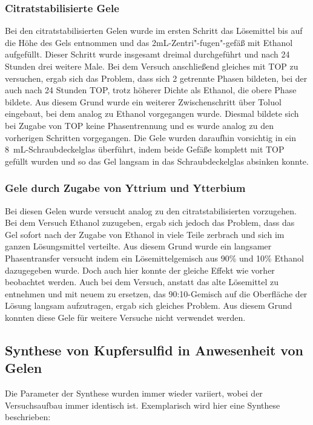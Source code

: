			\subsubsection{Citratstabilisierte Gele}
				Bei den citratstabilisierten Gelen wurde im ersten Schritt das Lösemittel bis auf die Höhe des Gels  entnommen und das 2mL-Zentri"-fugen"-gefäß mit Ethanol aufgefüllt.
				Dieser Schritt wurde insgesamt dreimal durchgeführt und nach 24 Stunden drei weitere Male.
				Bei dem Versuch anschließend gleiches mit TOP zu versuchen, ergab sich das Problem, dass sich 2 getrennte Phasen bildeten, bei der auch nach 24 Stunden TOP, trotz höherer Dichte als Ethanol, die obere Phase bildete.
				Aus diesem Grund wurde ein weiterer Zwischenschritt über Toluol eingebaut, bei dem analog zu Ethanol vorgegangen wurde.
				Diesmal bildete sich bei Zugabe von TOP keine Phasentrennung und es wurde analog zu den vorherigen Schritten vorgegangen.
				Die Gele wurden daraufhin vorsichtig in ein \SI{8}{\milli\liter}-Schraubdeckelglas überführt, indem beide Gefäße komplett mit TOP gefüllt wurden und so das Gel langsam in das Schraubdeckelglas absinken konnte.
			
			\subsubsection{Gele durch Zugabe von Yttrium und Ytterbium}
				Bei diesen Gelen wurde versucht analog zu den citratstabilisierten vorzugehen.
				Bei dem Versuch Ethanol zuzugeben, ergab sich jedoch das Problem, dass das Gel sofort nach der Zugabe von Ethanol in viele Teile zerbrach und sich im ganzen Lösungsmittel verteilte.
				Aus diesem Grund wurde ein langsamer Phasentransfer versucht indem ein Lösemittelgemisch aus 90\%  und 10\% Ethanol dazugegeben wurde.
				Doch auch hier konnte der gleiche Effekt wie vorher beobachtet werden.
				Auch bei dem Versuch, anstatt das alte Lösemittel zu entnehmen und mit neuem zu ersetzen, das 90:10-Gemisch auf die Oberfläche der Lösung langsam aufzutragen, ergab sich gleiches Problem.
				Aus diesem Grund konnten diese Gele für weitere Versuche nicht verwendet werden.   
	
	\subsection{Synthese von Kupfersulfid in Anwesenheit von Gelen}
		
			Die Parameter der Synthese wurden immer wieder variiert, wobei der Versuchsaufbau immer identisch ist.
			Exemplarisch wird hier eine Synthese beschrieben:
			
